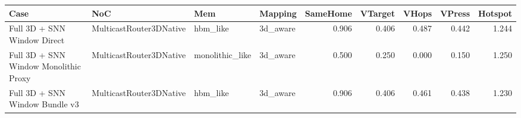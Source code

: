 \begin{tabular}{l l l l r r r r r}
\hline
Case & NoC & Mem & Mapping & SameHome & VTarget & VHops & VPress & Hotspot \\
\hline
Full 3D + SNN Window Direct & MulticastRouter3DNative & hbm\_like & 3d\_aware & 0.906 & 0.406 & 0.487 & 0.442 & 1.244 \\
Full 3D + SNN Window Monolithic Proxy & MulticastRouter3DNative & monolithic\_like & 3d\_aware & 0.500 & 0.250 & 0.000 & 0.150 & 1.250 \\
Full 3D + SNN Window Bundle v3 & MulticastRouter3DNative & hbm\_like & 3d\_aware & 0.906 & 0.406 & 0.461 & 0.438 & 1.230 \\
\hline
\end{tabular}
